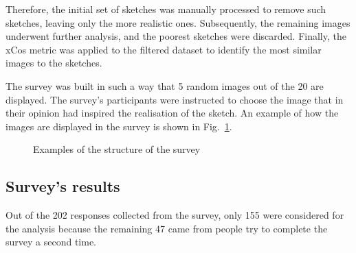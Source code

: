 \noindent Therefore, the initial set of sketches was manually processed to remove such sketches, leaving only the more realistic ones. Subsequently, the remaining images underwent further analysis, and the poorest sketches were discarded. Finally, the xCos metric was applied to the filtered dataset to identify the most similar images to the sketches.


\noindent The survey was built in such a way that \num{5} random images out of the \num{20} are displayed. The survey's participants were instructed to choose the image that in their opinion had inspired the realisation of the sketch. An example of how the images are displayed in the survey is shown in Fig.~\ref{fig:survey images}.
\begin{figure}[htbp]
    \centering
     \quad
    \caption{Examples of the structure of the survey}
    \label{fig:survey images}
\end{figure}
%

\subsection{Survey's results}
\label{sec:survey results}
Out of the \num{202} responses collected from the survey,  only \num{155} were considered for the analysis because the remaining \num{47} came from people try to complete the survey a second time.


